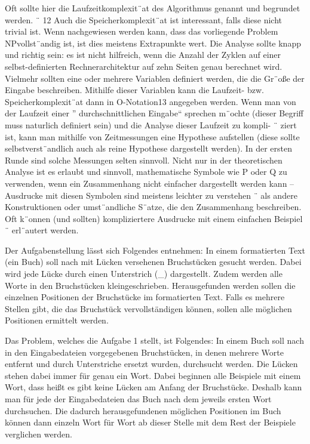 \documentclass[a4paper,10pt,ngerman]{scrartcl}
\begin{document}
    Oft sollte hier die Laufzeitkomplexit¨at des Algorithmus genannt und begrundet werden.
    ¨ 12 Auch die Speicherkomplexit¨at ist interessant, falls diese nicht trivial ist.
    Wenn nachgewiesen werden kann, dass das vorliegende Problem NPvollst¨andig ist, ist dies meistens Extrapunkte wert.
    Die Analyse sollte knapp und richtig
    sein: es ist nicht hilfreich, wenn die Anzahl der Zyklen auf einer selbst-definierten Rechnerarchitektur auf zehn Seiten genau berechnet wird.
    Vielmehr sollten eine oder mehrere
    Variablen definiert werden, die die Gr¨oße der Eingabe beschreiben.
    Mithilfe dieser Variablen kann die Laufzeit- bzw.
    Speicherkomplexit¨at dann in O-Notation13 angegeben
    werden.
    Wenn man von der Laufzeit einer ”
    durchschnittlichen Eingabe“ sprechen m¨ochte
    (dieser Begriff muss naturlich definiert sein) und die Analyse dieser Laufzeit zu kompli- ¨
    ziert ist, kann man mithilfe von Zeitmessungen eine Hypothese aufstellen (diese sollte
    selbstverst¨andlich auch als reine Hypothese dargestellt werden).
    In der ersten Runde sind solche Messungen selten sinnvoll.
    Nicht nur in der theoretischen Analyse ist es erlaubt und sinnvoll, mathematische
    Symbole wie P oder Q
    zu verwenden, wenn ein Zusammenhang nicht einfacher dargestellt werden kann – Ausdrucke mit diesen Symbolen sind meistens leichter zu verstehen ¨
    als andere Konstruktionen oder umst¨andliche S¨atze, die den Zusammenhang beschreiben.
    Oft k¨onnen (und sollten) kompliziertere Ausdrucke mit einem einfachen Beispiel ¨
    erl¨autert werden.

    Der Aufgabenstellung lässt sich Folgendes entnehmen:
        In einem formatierten Text (ein Buch) soll nach mit Lücken versehenen Bruchstücken gesucht werden.
        Dabei wird jede Lücke durch einen Unterstrich (_) dargestellt.
        Zudem werden alle Worte in den Bruchstücken kleingeschrieben.
        Herausgefunden werden sollen die einzelnen Positionen der Bruchstücke im formatierten Text.
        Falls es mehrere Stellen gibt, die das Bruchstück vervollständigen können, sollen alle möglichen Positionen ermittelt werden.

    Das Problem, welches die Aufgabe 1 stellt, ist Folgendes: In einem Buch soll nach in den Eingabedateien vorgegebenen Bruchstücken,
    in denen mehrere Worte entfernt und durch Unterstriche ersetzt wurden, durchsucht werden.
    Die Lücken stehen dabei immer für genau ein Wort.
    Dabei beginnen alle Beispiele mit einem Wort, dass heißt es gibt keine Lücken am Anfang der Bruchstücke.
    Deshalb kann man für jede der Eingabedateien das Buch nach dem jeweils ersten Wort durchsuchen.
    Die dadurch herausgefundenen möglichen Positionen im Buch können dann einzeln Wort für Wort ab dieser Stelle mit dem Rest der Beispiele verglichen werden.
\end{document}
